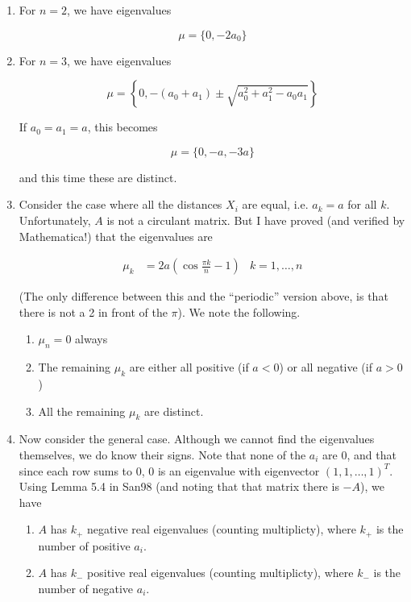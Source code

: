 \documentclass[12pt]{article}
\begin{document}
\begin{enumerate}

\item For $n = 2$, we have eigenvalues

\[
\mu = \{ 0, -2 a_0 \}
\]

\item For $n = 3$, we have eigenvalues

\[
\mu = \left\{ 0,  -(a_0 + a_1) \pm 
\sqrt{a_0^2 + a_1^2 - a_0 a_1} \right\}
\]

If $a_0 = a_1 = a$, this becomes

\[
\mu = \{0,  -a, -3a \}
\]

and this time these are distinct.

\item Consider the case where all the distances $X_i$ are equal, i.e. $a_k = a$ for all $k$. Unfortunately, $A$ is not a circulant matrix. But I have proved (and verified by Mathematica!) that the eigenvalues are 

\begin{align*}
\mu_k &= 2 a\left( \cos \frac{\pi k}{n}  - 1 \right) & k = 1, \dots, n
\end{align*}

(The only difference between this and the ``periodic'' version above, is that there is not a 2 in front of the $\pi$). We note the following.

\begin{enumerate}
	\item $\mu_n = 0$ always
	\item The remaining $\mu_k$ are either all positive (if $a < 0$) or all negative (if $a > 0$)
	\item All the remaining $\mu_k$ are distinct. 
\end{enumerate}

\item Now consider the general case. Although we cannot find the eigenvalues themselves, we do know their signs. Note that none of the $a_i$ are 0, and that since each row sums to 0, 0 is an eigenvalue with eigenvector $(1, 1, \dots, 1)^T$. Using Lemma 5.4 in San98 (and noting that that matrix there is $-A$), we have

\begin{enumerate}
	\item $A$ has $k_+$ negative real eigenvalues (counting multiplicty), where $k_+$ is the number of positive $a_i$.
	\item $A$ has $k_-$ positive real eigenvalues (counting multiplicty), where $k_-$ is the number of negative $a_i$.
\end{enumerate}

\end{enumerate}
\end{document}
